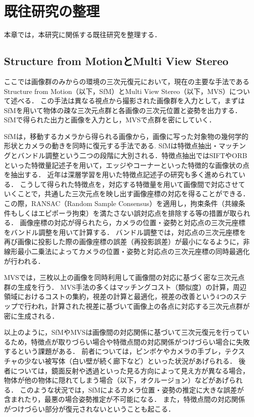 \section{既往研究の整理}\label{sec:researches}
本章では，本研究に関係する既往研究を整理する．\par
\subsection{Structure from MotionとMulti View Stereo}\label{subsec:Sfm_and_MVS}
ここでは画像群のみからの環境の三次元復元において，現在の主要な手法であるStructure from Motion（以下，SfM）とMulti View Stereo（以下，MVS）について述べる．
この手法は異なる視点から撮影された画像群を入力として，まずはSfMを用いて物体の疎な三次元点群と各画像の三次元位置と姿勢を出力する．
SfMで得られた出力と画像を入力とし，MVSで点群を密にしていく．\par

SfMは，移動するカメラから得られる画像から，画像に写った対象物の幾何学的形状とカメラの動きを同時に復元する手法である\cite{sfm_JP}.
SfMは特徴点抽出・マッチングとバンドル調整という二つの段階に大別される．特徴点抽出ではSIFT\cite{SIFT}やORB\cite{ORB}といった特徴量記述子を用いて，エッジやコーナーといった特徴的な画像状の点を抽出する．
近年は深層学習を用いた特徴点記述子の研究も多く進められている．
こうして得られた特徴点を，対応する特徴量を用いて画像間で対応させていくことで，共通した三次元点を映し出す画像座標の対応を得ることができる．この際，RANSAC（Random Sample Consensus）\cite{RANSAC}を適用し，拘束条件（共線条件もしくはエピポーラ拘束）を満たさない誤対応点を排除する等の措置が取られる．
画像座標の対応が得られたら，カメラの位置・姿勢と対応点の三次元座標をバンドル調整を用いて計算する．
バンドル調整では，対応点の三次元座標を再び画像に投影した際の画像座標の誤差（再投影誤差）が最小になるように，非線形最小二乗法によってカメラの位置・姿勢と対応点の三次元座標の同時最適化が行われる．\par

MVSでは，三枚以上の画像を同時利用して画像間の対応に基づく密な三次元点群の生成を行う．
MVS手法の多くはマッチングコスト（類似度）の計算，周辺領域におけるコストの集約，視差の計算と最適化，視差の改善という4つのステップで行われ\cite{mvs}，計算された視差に基づいて画像上の各点に対応する三次元点群が密に生成される．\par

以上のように，SfMやMVSは画像間の対応関係に基づいて三次元復元を行っているため，特徴点が取りづらい場合や特徴点間の対応関係がつけづらい場合に失敗するという課題がある．
前者については，ピンボケやカメラの手ブレ，テクスチャの少ない被写体（白い壁が続く廊下など）といった状況があげられる．
後者については，鏡面反射や透過といった見る方向によって見え方が異なる場合，物体が他の物体に隠れてしまう場合（以下，オクルージョン）などがあげられる．
このような状況では，SfMによるカメラ位置・姿勢の推定に大きな誤差が含まれたり，最悪の場合姿勢推定が不可能になる．
また，特徴点間の対応関係がつけづらい部分が復元されないということも起こる．\par


